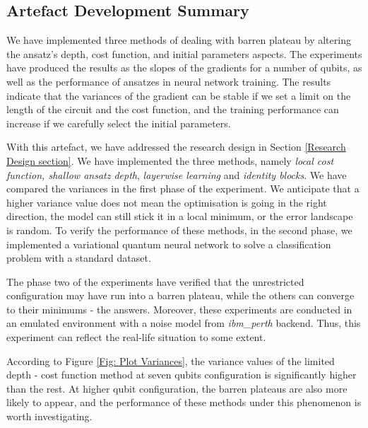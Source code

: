 \subsection{Artefact Development Summary}

We have implemented three methods of dealing with barren plateau by altering the ansatz's depth, cost function, and initial parameters aspects.
The experiments have produced the results as the slopes of the gradients for a number of qubits, as well as the performance of ansatzes in neural network training.
The results indicate that the variances of the gradient can be stable if we set a limit on the length of the circuit and the cost function, and the training performance can increase if we carefully select the initial parameters.

With this artefact, we have addressed the research design in Section \ref{Research Design section}.
We have implemented the three methods, namely \textit{local cost function, shallow ansatz depth}, \textit{layerwise learning} and \textit{identity blocks}.
We have compared the variances in the first phase of the experiment.
We anticipate that a higher variance value does not mean the optimisation is going in the right direction, the model can still stick it in a local minimum, or the error landscape is random.
To verify the performance of these methods, in the second phase, we implemented a variational quantum neural network to solve a classification problem with a standard dataset.

The phase two of the experiments have verified that the unrestricted configuration may have run into a barren plateau, while the others can converge to their minimums - the answers.
Moreover, these experiments are conducted in an emulated environment with a noise model from \emph{ibm\_perth} backend.
Thus, this experiment can reflect the real-life situation to some extent.

According to Figure \ref{Fig: Plot Variances}, the variance values of the limited depth - cost function method at seven qubits configuration is significantly higher than the rest.
At higher qubit configuration, the barren plateaus are also more likely to appear, and the performance of these methods under this phenomenon is worth investigating.
